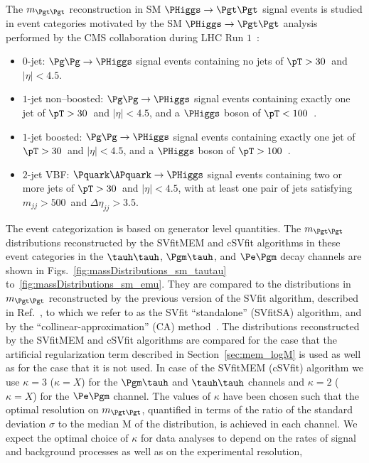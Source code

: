 The $m_{\Pgt\Pgt}$ reconstruction in SM $\PHiggs \to \Pgt\Pgt$ signal events is studied in event categories motivated by the
SM $\PHiggs \to \Pgt\Pgt$ analysis performed by the CMS collaboration during LHC Run $1$~\cite{HIG-13-004}:
\begin{itemize}
\item $0$-jet: 
  $\Pg\Pg \to \PHiggs$ signal events 
  containing no jets of $\pT > 30$~\GeV and $\lvert \eta \rvert < 4.5$.
\item $1$-jet non--boosted:
  $\Pg\Pg \to \PHiggs$ signal events 
  containing exactly one jet of $\pT > 30$~\GeV and $\lvert \eta \rvert < 4.5$,
  and a $\PHiggs$ boson of $\pT < 100$~\GeV.
\item $1$-jet boosted:
  $\Pg\Pg \to \PHiggs$ signal events 
  containing exactly one jet of $\pT > 30$~\GeV and $\lvert \eta \rvert < 4.5$,
  and a $\PHiggs$ boson of $\pT > 100$~\GeV.
\item $2$-jet VBF:
  $\Pquark\APquark \to \PHiggs$ signal events
  containing two or more jets of $\pT > 30$~\GeV and $\lvert \eta \rvert < 4.5$,
  with at least one pair of jets satisfying $m_{jj} > 500$~\GeV and $\Delta\eta_{jj} > 3.5$.
\end{itemize}
The event categorization is based on generator level quantities.
The $m_{\Pgt\Pgt}$ distributions reconstructed by the SVfitMEM and cSVfit algorithms in these event categories 
in the $\tauh\tauh$, $\Pgm\tauh$, and $\Pe\Pgm$ decay channels are shown in Figs.~\ref{fig:massDistributions_sm_tautau} to~\ref{fig:massDistributions_sm_emu}.
They are compared to the distributions in $m_{\Pgt\Pgt}$  reconstructed by the previous version of the
SVfit algorithm, described in Ref.~\cite{SVfit}, to which we refer to as the SVfit ``standalone'' (SVfitSA) algorithm,
and by the ``collinear-approximation'' (CA) method~\cite{massRecoCollinearApprox}.
The distributions reconstructed by the SVfitMEM and cSVfit algorithms are compared
for the case that the artificial regularization term described in Section~\ref{sec:mem_logM} is used as well as for the case that it is not used.
In case of the SVfitMEM (cSVfit) algorithm we use $\kappa = 3$ ($\kappa = X$) for the $\Pgm\tauh$ and $\tauh\tauh$ channels and $\kappa = 2$ ($\kappa = X$) for the $\Pe\Pgm$ channel.
The values of $\kappa$ have been chosen such that the optimal resolution on $m_{\Pgt\Pgt}$, 
quantified in terms of the ratio of the standard deviation $\sigma$ to the median $\textrm{M}$ of the distribution,
is achieved in each channel.
We expect the optimal choice of $\kappa$ for data analyses
to depend on the rates of signal and background processes as well as on the experimental resolution,
